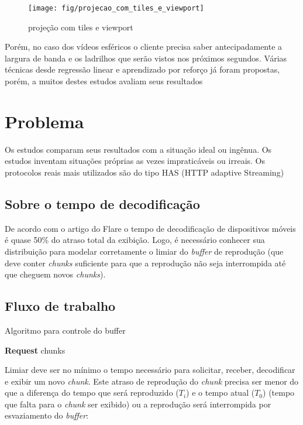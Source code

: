 \begin{figure}[tbh]
	\centering
	\texttt{[image: fig/projecao\_com\_tiles\_e\_viewport]}
	\caption{projeção com tiles e viewport}
	\label{fig:projecaocomtileseviewport}
\end{figure}

Porém, no caso dos vídeos esféricos o cliente precisa saber antecipadamente a largura de banda e os ladrilhos que serão vistos nos próximos segundos. Várias técnicas desde regressão linear e aprendizado por reforço já foram propostas, porém, a muitos destes estudos avaliam seus resultados

\section{Problema}

Os estudos comparam seus resultados com a situação ideal ou ingênua. Os estudos inventam situações próprias as vezes impraticáveis ou irreais. Os protocolos reais mais utilizados são do tipo HAS (HTTP adaptive Streaming)

\subsection{Sobre o tempo de decodificação}

De acordo com o artigo do Flare o tempo de decodificação de dispositivos móveis é quase 50\% do atraso total da exibição. Logo, é necessário conhecer sua distribuição para modelar corretamente o limiar do \textit{buffer} de reprodução (que deve conter \textit{chunks} suficiente para que a reprodução não seja interrompida até que cheguem novos \textit{chunks}).

\subsection{Fluxo de trabalho}

\begin{algorithm}
	\caption{Algoritmo para controle do buffer}\label{alg:buffer_control}
	\begin{algorithmic}[1]
		
				\State \textbf{Request} chunks
			\EndWhile
		\EndIf
	\EndWhile
	\end{algorithmic}
\end{algorithm}

Limiar deve ser no mínimo o tempo necessário para solicitar, receber, decodificar e exibir um novo \textit{chunk}. Este atraso de reprodução do \textit{chunk} precisa ser menor do que a diferença do tempo que será reproduzido ($T_i$) e o tempo atual ($T_0$) (tempo que falta para o \textit{chunk} ser exibido) ou a reprodução será interrompida por esvaziamento do \textit{buffer}:

